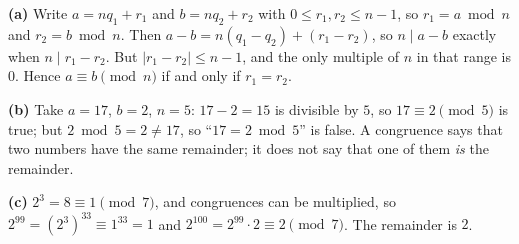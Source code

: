 \textbf{(a)} Write $a=nq_1+r_1$ and $b=nq_2+r_2$ with $0\le r_1,r_2\le n-1$, so $r_1=a\bmod n$ and $r_2=b\bmod n$. Then $a-b=n(q_1-q_2)+(r_1-r_2)$, so $n\mid a-b$ exactly when $n\mid r_1-r_2$. But $|r_1-r_2|\le n-1$, and the only multiple of $n$ in that range is $0$. Hence $a\equiv b\pmod n$ if and only if $r_1=r_2$.

\textbf{(b)} Take $a=17$, $b=2$, $n=5$: $17-2=15$ is divisible by $5$, so $17\equiv2\pmod5$ is true; but $2\bmod5=2\ne17$, so ``$17=2\bmod5$'' is false. A congruence says that two numbers have the same remainder; it does not say that one of them \emph{is} the remainder.

\textbf{(c)} $2^3=8\equiv1\pmod7$, and congruences can be multiplied, so $2^{99}=(2^3)^{33}\equiv1^{33}=1$ and $2^{100}=2^{99}\cdot2\equiv2\pmod7$. The remainder is $\boxed{2}$.
